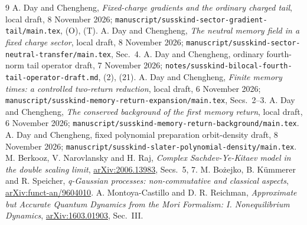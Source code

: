 \documentclass[11pt]{article}
\begin{document}
\begin{thebibliography}{9}\small
{} A. Day and Chengheng, \emph{Fixed-charge gradients
and the ordinary charged tail}, local draft, 8 November 2026;
\texttt{manuscript/susskind-sector-gradient-tail/main.tex}, (O), (T).
 A. Day and Chengheng, \emph{The neutral memory field
in a fixed charge sector}, local draft, 8 November 2026;
\texttt{manuscript/susskind-sector-neutral-transfer/main.tex}, Sec.~4.
 A. Day and Chengheng, ordinary fourth-norm tail
operator draft, 7 November 2026;
\texttt{notes/susskind-bilocal-fourth-tail-operator-draft.md}, (2), (21).
 A. Day and Chengheng, \emph{Finite memory times:
a controlled two-return reduction}, local draft, 6 November 2026;
\texttt{manuscript/susskind-memory-return-expansion/main.tex}, Secs.~2--3.
 A. Day and Chengheng, \emph{The conserved
background of the first memory return}, local draft, 6 November 2026;
\texttt{manuscript/susskind-memory-return-background/main.tex}.
 A. Day and Chengheng, fixed polynomial preparation
orbit-density draft, 8 November 2026;
\texttt{manuscript/susskind-slater-polynomial-density/main.tex}.
 M. Berkooz, V. Narovlansky and H. Raj,
\emph{Complex Sachdev-Ye-Kitaev model in the double scaling limit},
\href{https://arxiv.org/abs/2006.13983}{arXiv:2006.13983}, Secs.~5, 7.
 M. Bo\.{z}ejko, B. K\"ummerer and R. Speicher,
\emph{q-Gaussian processes: non-commutative and classical aspects},
\href{https://arxiv.org/abs/funct-an/9604010}{arXiv:funct-an/9604010}.
 A. Montoya-Castillo and D. R. Reichman,
\emph{Approximate but Accurate Quantum Dynamics from the Mori
Formalism: I. Nonequilibrium Dynamics},
\href{https://arxiv.org/abs/1603.01903}{arXiv:1603.01903}, Sec.~III.
\end{thebibliography}
\end{document}
